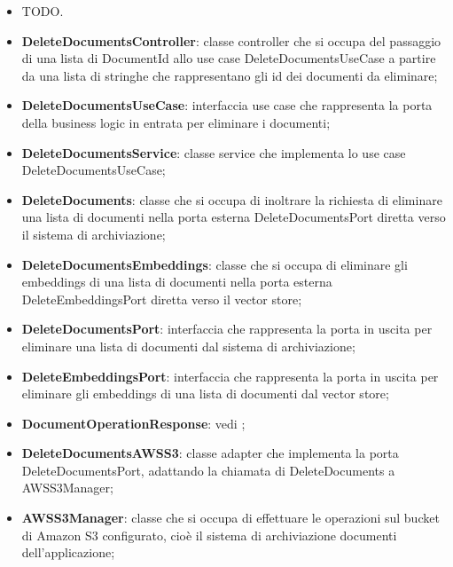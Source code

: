 \documentclass[10pt, a4paper]{article}
\begin{document}
\begin{itemize}
    \item TODO.
\end{itemize}

\begin{itemize}
    \item \label{DeleteDocumentsController}\textbf{DeleteDocumentsController}: classe controller che si occupa del passaggio di una lista di DocumentId allo use case DeleteDocumentsUseCase a partire da una lista di stringhe che rappresentano gli id dei documenti da eliminare;
    \item \label{DeleteDocumentsUseCase}\textbf{DeleteDocumentsUseCase}: interfaccia use case che rappresenta la porta della business logic in entrata per eliminare i documenti;
    \item \label{DeleteDocumentsService}\textbf{DeleteDocumentsService}: classe service che implementa lo use case DeleteDocumentsUseCase;
    \item \label{DeleteDocuments}\textbf{DeleteDocuments}: classe che si occupa di inoltrare la richiesta di eliminare una lista di documenti nella porta esterna DeleteDocumentsPort diretta verso il sistema di archiviazione;
    \item \label{DeleteDocumentsEmbeddings}\textbf{DeleteDocumentsEmbeddings}: classe che si occupa di eliminare gli embeddings di una lista di documenti nella porta esterna DeleteEmbeddingsPort diretta verso il vector store;
    \item \label{DeleteDocumentsPort}\textbf{DeleteDocumentsPort}: interfaccia che rappresenta la porta in uscita per eliminare una lista di documenti dal sistema di archiviazione;
    \item \label{DeleteEmbeddingsPort}\textbf{DeleteEmbeddingsPort}: interfaccia che rappresenta la porta in uscita per eliminare gli embeddings di una lista di documenti dal vector store;
    \item \textbf{DocumentOperationResponse}: vedi ;
    \item \label{DeleteDocumentsAWSS3}\textbf{DeleteDocumentsAWSS3}: classe adapter che implementa la porta DeleteDocumentsPort, adattando la chiamata di DeleteDocuments a AWSS3Manager;
    \item \label{AWSS3Manager}\textbf{AWSS3Manager}: classe che si occupa di effettuare le operazioni sul bucket di Amazon S3 configurato, cioè il sistema di archiviazione documenti dell'applicazione;

\end{itemize}
\end{document}
